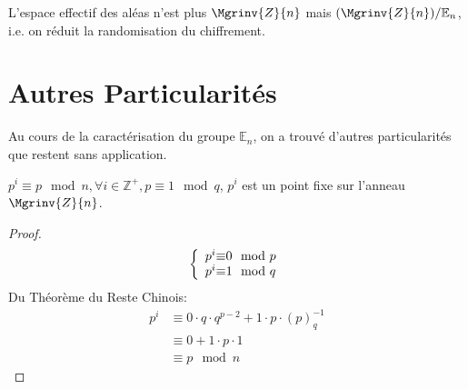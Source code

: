 			L'espace effectif des aléas n'est plus $\Mgrinv{Z}{n}$ mais $(\Mgrinv{Z}{n}) / \mathbb{E}_n$, i.e. on réduit la randomisation 
			du chiffrement.

		\section{Autres Particularités}
		
		Au cours de la caractérisation du groupe $\mathbb{E}_n$, on a trouvé d'autres particularités que restent sans application. 
		
		\begin{theorem}{$p^i \equiv p \mod{n}, \forall i \in \mathbb{Z}^+, p\equiv1 \mod{q}$, $p^i$ est un point fixe sur l'anneau $\Mgrinv{Z}{n}$.}
			\begin{proof}
				\begin{align}
					\left \{
						\begin{array}{c @{\equiv} c}
						    p^i & 0 \mod{p} \\
					    p^i & 1 \mod{q} \\
					\end{array}
					\right. 
				\end{align}
				Du Théorème du Reste Chinois:
				\begin{align}
					p^i &\equiv 0\cdot q \cdot q^{p-2}+1\cdot p \cdot (p)^{-1}_{q}  \nonumber\\
					&\equiv 0+1\cdot p \cdot 1 \nonumber\\
					&\equiv p \mod{n}
				\end{align}
			\end{proof}
		\end{theorem}
